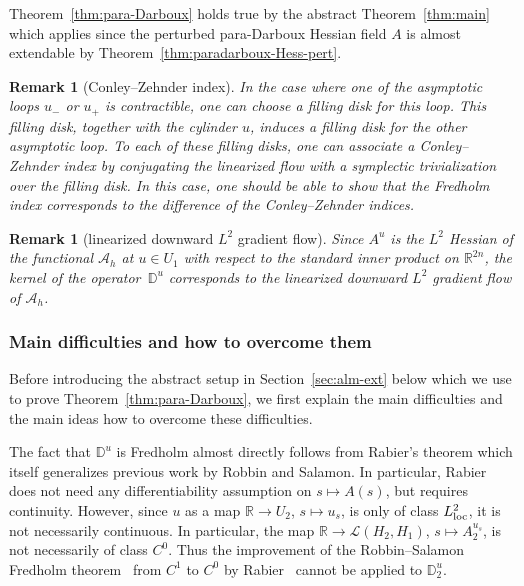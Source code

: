 \documentclass[pdftex]{sigma}
\numberwithin{equation}{section}
\newtheorem{Remark}[Theorem]{Remark}
\newcommand{\D}{{\mathbb{D}}}
\newcommand{\R}{{\mathbb{R}}}
\newcommand{\Aa}{{\mathcal{A}}} %
\newcommand{\Ll}{{\mathcal{L}}} %
\newcommand{\1}{{{\mathchoice {\rm 1\mskip-4mu l} {\rm 1\mskip-4mu l}
{\rm 1\mskip-4.5mu l} {\rm 1\mskip-5mu l}}}}
\begin{document}
Theorem~\ref{thm:para-Darboux}
holds true by the abstract Theorem~\ref{thm:main}
which applies since the perturbed para-Darboux Hessian field $A$
is almost extendable by Theorem~\ref{thm:paradarboux-Hess-pert}.

\begin{Remark}[Conley--Zehnder index]
In the case where one of the asymptotic loops $u_-$ or $u_+$
is contractible, one can choose a filling disk for this loop.
This filling disk, together with the cylinder $u$,
induces a filling disk for the other asymptotic loop.
To each of these filling disks, one can associate a Conley--Zehnder
index by conjugating the linearized flow with a symplectic
trivialization over the filling disk.
In this case, one should be able to show
that the Fredholm index corresponds to the difference
of the Conley--Zehnder indices.
\end{Remark}

\begin{Remark}[linearized downward $L^2$ gradient flow]
Since $A^u$ is the $L^2$ Hessian of the functional $\Aa_h$
at $u\in U_1$ with respect to the standard inner product on $\R^{2n}$,
the kernel of the operator~$\D^u$ corresponds to the linearized downward
$L^2$ gradient flow of $\Aa_h$.
\end{Remark}

\subsubsection*{Main difficulties and how to overcome them}

Before introducing the abstract setup in Section~\ref{sec:alm-ext}
below which we use to prove
Theorem~\ref{thm:para-Darboux}, we first explain the main difficulties
and the main ideas how to overcome these difficulties.

The fact that $\D^u$ is Fredholm almost directly follows from
Rabier's theorem which itself generalizes previous work by
Robbin and Salamon.
In particular, Rabier does not need any differentiability assumption
on $s\mapsto A(s)$, but requires continuity.
However, since $u$ as a map $\R\to U_2$, $s\mapsto u_s$,
is only of class $L^2_{\rm loc}$, it is not necessarily continuous.
In particular, the map $\R\to \Ll(H_2,H_1)$, $s\mapsto A^{u_s}_2$,
is not necessarily of class $C^0$.
Thus the improvement of the Robbin--Salamon Fredholm
theorem~\cite{robbin:1995a} from $C^1$ to $C^0$
by Rabier~\cite{Rabier:2004a} cannot be applied to $\D^u_2$.
\end{document}
